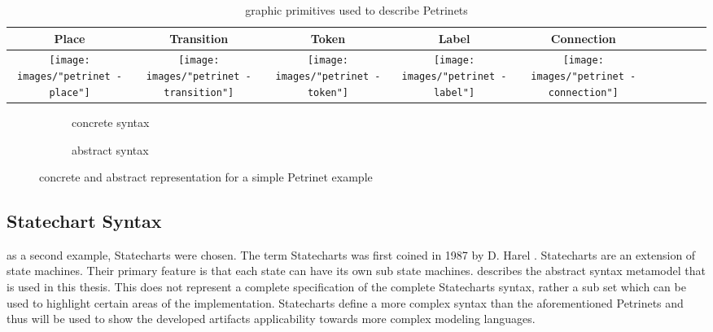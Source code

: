 \begin{table}[ht]
  \centering
\begin{tabular}[width=.1\linewidth]{| Sc | Sc | Sc | Sc | Sc |}
  \hline
  Place & Transition & Token & Label & Connection 
  \\
  \hline
  \texttt{[image: images/"petrinet - place"]} 
  & 
  \texttt{[image: images/"petrinet - transition"]} 
  & 
  \texttt{[image: images/"petrinet - token"]}
  & 
  \texttt{[image: images/"petrinet - label"]}
  & 
  \texttt{[image: images/"petrinet - connection"]} 
  \\
  \hline
\end{tabular}
\caption{graphic primitives used to describe Petrinets}
\label{tab:petri-primitives}
\end{table}

\begin{figure}[ht!]
  \centering
  \begin{subfigure}[t]{.3\textwidth}
    \centering
    
    \caption{concrete syntax}
    \label{subfig:petriconcrete}    
  \end{subfigure}
  \begin{subfigure}[t]{.35\textwidth}
    \centering
    
    \caption{abstract syntax}
    \label{subfig:petriabstract}    
  \end{subfigure}
  \caption{concrete and abstract representation for a simple Petrinet example}
  \label{fig:petrinets_example}
\end{figure} 

\subsection{Statechart Syntax}
\label{sec:statecharts}
as a second example, Statecharts were chosen. The term Statecharts was first coined in 1987 by D. Harel \cite{harel1987statecharts}. Statecharts are an extension of state machines. Their primary feature is that each state can have its own sub state machines.  describes the abstract syntax metamodel that is used in this thesis. This does not represent a complete specification of the complete Statecharts syntax, rather a sub set which can be used to highlight certain areas of the implementation. Statecharts define a more complex syntax than the aforementioned Petrinets and thus will be used to show the developed artifacts applicability towards more complex modeling languages.

